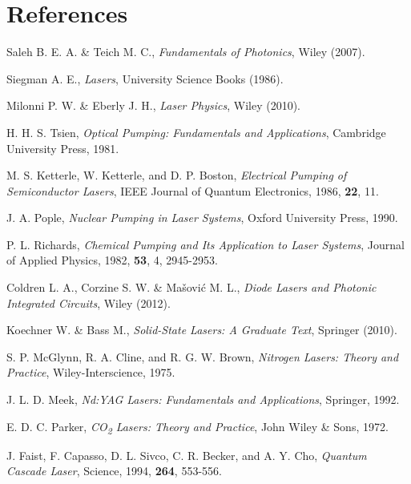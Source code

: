 \documentclass[prl,twocolumn]{revtex4-1}
\begin{document}
\section*{References}
\begin{thebibliography}{99}

Saleh B. E. A. \& Teich M. C., \textit{Fundamentals of Photonics}, Wiley (2007).

Siegman A. E., \textit{Lasers}, University Science Books (1986).

Milonni P. W. \& Eberly J. H., \textit{Laser Physics}, Wiley (2010).

H. H. S. Tsien, \textit{Optical Pumping: Fundamentals and Applications}, Cambridge University Press, 1981.

M. S. Ketterle, W. Ketterle, and D. P. Boston, \textit{Electrical Pumping of Semiconductor Lasers}, IEEE Journal of Quantum Electronics, 1986, \textbf{22}, 11.

J. A. Pople, \textit{Nuclear Pumping in Laser Systems}, Oxford University Press, 1990.

P. L. Richards, \textit{Chemical Pumping and Its Application to Laser Systems}, Journal of Applied Physics, 1982, \textbf{53}, 4, 2945-2953.

Coldren L. A., Corzine S. W. \& Mašović M. L., \textit{Diode Lasers and Photonic Integrated Circuits}, Wiley (2012).

Koechner W. \& Bass M., \textit{Solid-State Lasers: A Graduate Text}, Springer (2010).

S. P. McGlynn, R. A. Cline, and R. G. W. Brown, \textit{Nitrogen Lasers: Theory and Practice}, Wiley-Interscience, 1975.

J. L. D. Meek, \textit{Nd:YAG Lasers: Fundamentals and Applications}, Springer, 1992.

E. D. C. Parker, \textit{CO\textsubscript{2} Lasers: Theory and Practice}, John Wiley \& Sons, 1972.

J. Faist, F. Capasso, D. L. Sivco, C. R. Becker, and A. Y. Cho, \textit{Quantum Cascade Laser}, Science, 1994, \textbf{264}, 553-556.

\end{thebibliography}
\end{document}
